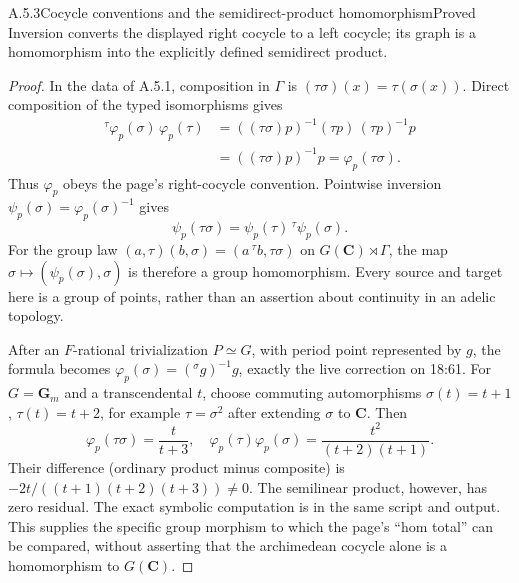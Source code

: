 \begin{result}{A.5.3}{Cocycle conventions and the semidirect-product homomorphism}{Proved}
Inversion converts the displayed right cocycle to a left cocycle; its graph is a homomorphism into the explicitly defined semidirect product.
\end{result}
\begin{proof}
In the data of A.5.1, composition in \(\Gamma\) is
\((\tau\sigma)(x)=\tau(\sigma(x))\). Direct composition of the typed
isomorphisms gives
\[
\begin{aligned}
{}^\tau\varphi_p(\sigma)\,\varphi_p(\tau)
&=((\tau\sigma)p)^{-1}(\tau p)\,(\tau p)^{-1}p\\
&=((\tau\sigma)p)^{-1}p
=\varphi_p(\tau\sigma).
\end{aligned}
\]
Thus \(\varphi_p\) obeys the page's right-cocycle convention. Pointwise
inversion \(\psi_p(\sigma)=\varphi_p(\sigma)^{-1}\) gives
\[
\psi_p(\tau\sigma)=\psi_p(\tau)\,{}^\tau\psi_p(\sigma).
\]
For the group law
\((a,\tau)(b,\sigma)=(a\,{}^\tau b,\tau\sigma)\) on
\(G(\mathbf C)\rtimes\Gamma\), the map
\(\sigma\mapsto(\psi_p(\sigma),\sigma)\) is therefore a group
homomorphism. Every source and target here is a group of points, rather
than an assertion about continuity in an adelic topology.

After an \(F\)-rational trivialization \(P\simeq G\), with period point
represented by \(g\), the formula becomes
\(\varphi_p(\sigma)=({}^\sigma g)^{-1}g\), exactly the live correction
on 18:61. For \(G=\mathbf G_m\) and a transcendental \(t\), choose
commuting automorphisms \(\sigma(t)=t+1\), \(\tau(t)=t+2\), for example
\(\tau=\sigma^2\) after extending \(\sigma\) to \(\mathbf C\). Then
\[
\varphi_p(\tau\sigma)=\frac{t}{t+3},\quad
\varphi_p(\tau)\varphi_p(\sigma)=\frac{t^2}{(t+2)(t+1)}.
\]
Their difference (ordinary product minus composite) is
\(-2t/((t+1)(t+2)(t+3))\ne0\). The semilinear product, however, has
zero residual. The exact symbolic computation is in the same script and
output. This supplies the specific group morphism to which the page's
``hom total'' can be compared, without asserting that the archimedean
cocycle alone is a homomorphism to \(G(\mathbf C)\).
\end{proof}

